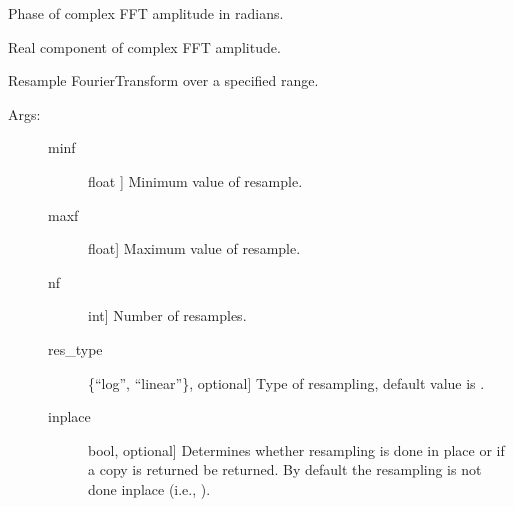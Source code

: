 \documentclass[letterpaper,10pt,english]{sphinxmanual}
\begin{document}
\begin{fulllineitems}
\begin{fulllineitems}
\end{fulllineitems}


\begin{fulllineitems}
\label{\detokenize{index:sigpropy.FourierTransform.phase}}
Phase of complex FFT amplitude in radians.

\end{fulllineitems}


\begin{fulllineitems}
\label{\detokenize{index:sigpropy.FourierTransform.real}}
Real component of complex FFT amplitude.

\end{fulllineitems}


\begin{fulllineitems}
\label{\detokenize{index:sigpropy.FourierTransform.resample}}
Resample FourierTransform over a specified range.
\begin{description}
\item[{Args:}] \leavevmode\begin{description}
\item[{minf}] \leavevmode{[}float {]}
Minimum value of resample.

\item[{maxf}] \leavevmode{[}float{]}
Maximum value of resample.

\item[{nf}] \leavevmode{[}int{]}
Number of resamples.

\item[{res\_type}] \leavevmode{[}\{“log”, “linear”\}, optional{]}
Type of resampling, default value is .

\item[{inplace}] \leavevmode{[}bool, optional{]}
Determines whether resampling is done in place or 
if a copy is returned be returned. By default the
resampling is not done inplace (i.e., ).


\end{description}
\end{description}
\end{fulllineitems}
\end{fulllineitems}
\end{document}

